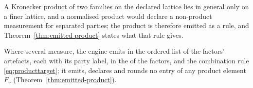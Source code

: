 
A Kronecker product of two families on the declared lattice lies in general
only on a finer lattice, and a normalised product would declare a non-product
measurement for separated parties; the product is therefore emitted as a
rule, and Theorem~\ref{thm:emitted-product} states what that rule gives.

\begin{requirement}\label{req:factorised-emission}
Where several  measure, the engine emits in
 the ordered list of the factors' artefacts, each with
its party label, in the  of the factors, and the combination
rule \eqref{eq:producttarget}; it emits, declares and rounds no entry of any
product element $F_v$ (Theorem~\ref{thm:emitted-product}).
\end{requirement}
